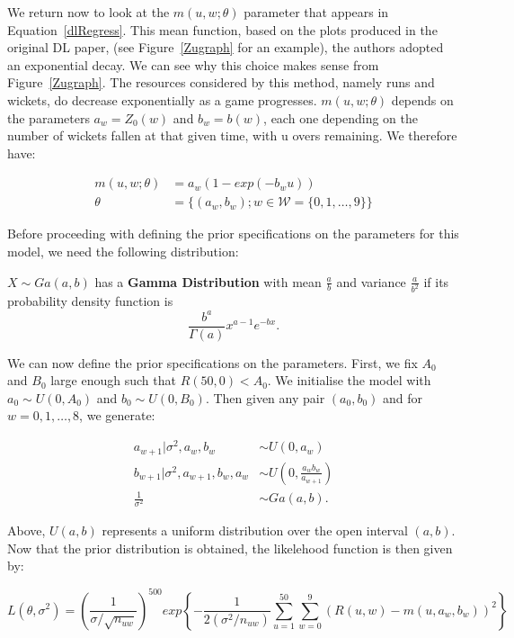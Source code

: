 We return now to look at the $m(u,w;\theta)$ parameter that appears in Equation~\ref{dlRegress}. This mean function, based on the plots produced in the original DL
paper, (see Figure~\ref{Zugraph} for an example), the authors adopted an exponential decay. We can see why this choice makes sense from Figure~\ref{Zugraph}.
The resources considered by this method, namely runs and wickets, do decrease exponentially as a game progresses. $m(u,w;\theta)$ depends on the parameters
$a_w = Z_0(w)$ and $b_w = b(w)$, each one depending on the number of wickets fallen at that given time, with u overs remaining. We therefore have:

\begin{align}
    \label{mdef}
        m(u,w;\theta) &= a_w(1-exp(-b_wu)) \\
               \theta &= \{ (a_w,b_w); w \in \mathcal{W}=\{0,1,\ldots,9\} \} 
\end{align}

Before proceeding with defining the prior specifications on the parameters for this model, we need the following distribution:

\begin{definition}
    $X \sim Ga(a,b)$ has a \textbf{Gamma Distribution} with mean $\frac{a}{b}$ and variance $\frac{a}{b^2}$ if its probability density function is
    $$
        \frac{b^a}{\Gamma(a)} x^{a-1}e^{-bx}.  
    $$
\end{definition}

We can now define the prior specifications on the parameters. First, we fix $A_0$ and $B_0$ large enough such that $R(50,0) < A_0$. We initialise  the model with
$a_0 \sim U(0,A_0)$ and $b_0 \sim U(0,B_0)$. Then given any pair $(a_0,b_0)$ and for $w=0,1,\ldots,8$, we generate:

\begin{align}
    a_{w+1}|\sigma^2,a_w,b_w &\sim U(0,a_w) \\
    b_{w+1}|\sigma^2,a_{w+1},b_w,a_w &\sim U\left(0,\frac{a_wb_w}{a_{w+1}}\right) \\
    \frac{1}{\sigma^2} &\sim Ga(a,b).
\end{align}

Above, $U(a,b)$ represents a uniform distribution over the open interval $(a,b)$. Now that the prior distribution is obtained, the likelehood function is then 
given by:

\begin{equation}
    L(\theta,\sigma^2) = \left( \frac{1}{\sigma / \sqrt{n_{uw}}} \right)^{500} exp \left\{ - \frac{1}{2(\sigma^2 / n_{uw})} \sum_{u=1}^{50} \sum_{w=0}^9 (R(u,w)-m(u,a_w,b_w))^2  \right\}
\end{equation}

